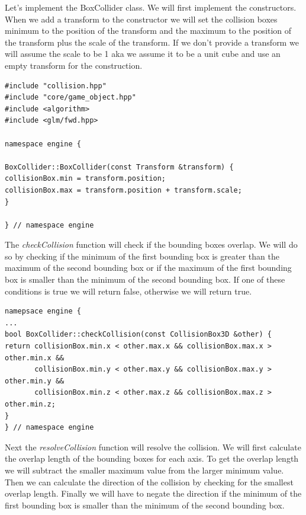 \documentclass[12pt]{report} \usepackage{preamble}
\begin{document}
Let's implement the BoxCollider class. We will first implement the constructors.
When we add a transform to the constructor we will set the collision boxes minimum to the position of the transform and
the maximum to the position of the transform plus the scale of the transform. If we don't provide a transform we will assume the scale to be 1 aka
we assume it to be a unit cube and use an empty transform for the construction.

\begin{lstlisting}[Language=C++]
#include "collision.hpp"
#include "core/game_object.hpp"
#include <algorithm>
#include <glm/fwd.hpp>

namespace engine {

BoxCollider::BoxCollider(const Transform &transform) {
collisionBox.min = transform.position;
collisionBox.max = transform.position + transform.scale;
}

} // namespace engine
\end{lstlisting}

The \textit{checkCollision} function will check if the bounding boxes overlap. We will do so by checking if the minimum of the first bounding box is greater than the maximum of the second bounding box
or if the maximum of the first bounding box is smaller than the minimum of the second bounding box. If one of these conditions is true we will return false, otherwise we will return true.

\begin{lstlisting}[Language=C++]
namepsace engine {
...
bool BoxCollider::checkCollision(const CollisionBox3D &other) {
return collisionBox.min.x < other.max.x && collisionBox.max.x > other.min.x &&
       collisionBox.min.y < other.max.y && collisionBox.max.y > other.min.y &&
       collisionBox.min.z < other.max.z && collisionBox.max.z > other.min.z;
}
} // namespace engine
\end{lstlisting}

Next the \textit{resolveCollision} function will resolve the collision. We will first calculate the overlap length of the bounding boxes for each axis.
To get the overlap length we will subtract the smaller maximum value from the larger minimum value. Then we can calculate the direction of the collision by
checking for the smallest overlap length. Finally we will have to negate the direction if the minimum of the first bounding box is smaller than the minimum of the second bounding box.
\end{document}
